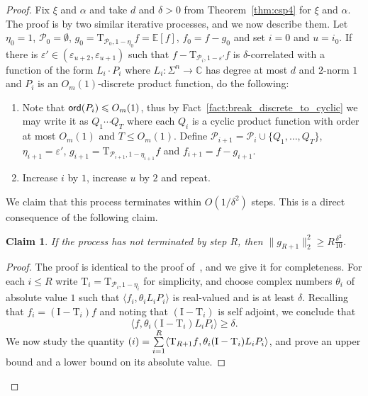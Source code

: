 \documentclass[11pt]{article}
\newtheorem{claim}[thm]{Claim}
\newcommand\E{\mathbb{E}}
\newcommand\norm[1]{\| #1 \|}
\newcommand\inner[2]{\langle{#1},{#2}\rangle}
\newcommand\eps{\varepsilon}
\renewcommand\geq{\geqslant}
\renewcommand\leq{\leqslant}
\newcommand{\rom}[1]{\uppercase\expandafter{\romannumeral #1\relax}}
\begin{document}
\begin{proof}
    Fix $\xi$ and $\alpha$ and take $d$ and $\delta>0$ from Theorem~\ref{thm:csp4} for $\xi$ and $\alpha$. 
    The proof is by two similar iterative processes, and we now describe them.
    Let $\eta_0=1$,   $\mathcal{P}_0 = \emptyset$, $g_0 = \mathrm{T}_{\mathcal{P}_0,1-\eta_0}f = \E[f]$,
    $f_0 = f-g_0$ and set $i=0$ and $u=i_0$. If there is $\eps'\in (\eps_{u+2},\eps_{u+1})$ such that $f-\mathrm{T}_{\mathcal{P}_{i},1-\eps'}f$ is $\delta$-correlated with a function of the form $L_i\cdot P_i$ where $L_i\colon \Sigma^{n}\to\mathbb{C}$ has degree at most $d$ and $2$-norm $1$ and $P_i$ is an $O_{m}(1)$-discrete product function, do the following:
    \begin{enumerate}
        \item Note that ${\sf ord}(P_i)\leq O_{m}(1)$, thus by Fact~\ref{fact:break_discrete_to_cyclic} we may write it as $Q_1\cdots Q_T$ where each $Q_i$ is a cyclic product function with order at most $O_{m}(1)$ and $T\leq O_{m}(1)$.   Define $\mathcal{P}_{i+1}=\mathcal{P}_i\cup \{Q_1,\ldots,Q_T\}$,
        $\eta_{i+1} = \eps'$,
        $g_{i+1} = \mathrm{T}_{\mathcal{P}_{i+1}, 1-\eta_{i+1}} f$ and $f_{i+1} = f-g_{i+1}$.
        \item Increase $i$ by $1$, increase $u$ by $2$ and repeat.
    \end{enumerate}
    We claim that this process terminates within $O(1/\delta^2)$ steps. This is a direct consequence of the following claim. 
    \begin{claim}\label{claim:it_process_key}
        If the process has not terminated by step $R$, 
        then $\norm{g_{R+1}}_2^2\geq R\frac{\delta^2}{10}$.
    \end{claim}
    \begin{proof}
        The proof is identical to the proof of~\cite[Claim 5.2]{BKM5}, and we give it for completeness. For each $i\leq R$ write $\mathrm{T}_i = \mathrm{T}_{\mathcal{P}_i,1-\eta_i}$ for simplicity, and choose complex numbers $\theta_i$ of absolute value $1$ such that 
        $\inner{f_i}{\theta_i L_i P_i}$ is real-valued and is at least $\delta$. Recalling that $f_i = (\mathrm{I}-\mathrm{T}_i)f$ and noting that $(\mathrm{I}-\mathrm{T}_i)$ is self adjoint, we conclude that
        \[
        \inner{f}{\theta_i (\mathrm{I}-\mathrm{T}_i)L_i P_i}\geq \delta.
        \]
        We now study the quantity $(\rom{1}) = \sum\limits_{i=1}^{R}\inner{\mathrm{T}_{R+1}f}{\theta_i (\mathrm{I}-\mathrm{T}_i)L_i P_i}$, and prove an upper bound and a lower bound on its absolute value.

\end{proof}
\end{proof}
\end{document}
